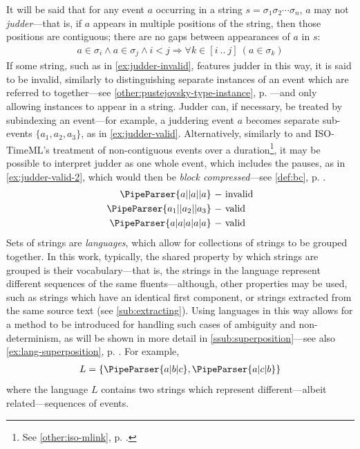 \documentclass[a4paper,12pt,leqno]{article}
\newcommand{\vph}[1]{\vphantom{#1}}
\newcommand{\ebox}[1]{\fbox{$\vph{'(),}#1$}}
\newcommand{\EventString}[1]{%
	\renewcommand*{\do}[1]{\ebox{##1}}%
	\PipeParser{#1}%
}
\begin{document}
It will be said that for any event $a$ occurring in a string $s = \sigma_1\sigma_2\cdots\sigma_n$, $a$ may not \textit{judder}---that is, if $a$ appears in multiple positions of the string, then those positions are contiguous; there are no gaps between appearances of $a$ in $s$:
\begin{align}\label{impl:contiguous-events}
	a \in \sigma_i \wedge a \in \sigma_j \wedge i < j \Longrightarrow \forall k \in [i~..~j]~(a \in \sigma_k)
\end{align}
If some string, such as in \cref{ex:judder-invalid}, features judder in this way, it is said to be invalid, similarly to \citet[p. 134]{Pustejovsky2005} distinguishing separate instances of an event which are referred to together---see \cref{other:pustejovsky-type-instance}, p. \pageref{other:pustejovsky-type-instance}---and only allowing instances to appear in a string. Judder can, if necessary, be treated by subindexing an event---for example, a juddering event $a$ becomes separate sub-events $\{a_1, a_2, a_3\}$, as in \cref{ex:judder-valid}. Alternatively, similarly to \citet{bunt2010annotating} and ISO-TimeML's treatment of non-contiguous events over a duration\footnote{See \cref{other:iso-mlink}, p. \pageref{other:iso-mlink}.}, it may be possible to interpret judder as one whole event, which includes the pauses, as in \cref{ex:judder-valid-2}, which would then be \textit{block compressed}---see \cref{def:bc}, p. \pageref{def:bc}.
\begin{subequations}\label{ex:judder}
	\begin{align}
		\EventString{a|{}|a|{}|a}\label{ex:judder-invalid} ~-~& \text{invalid}\\
		\EventString{a_1|{}|a_2|{}|a_3}\label{ex:judder-valid} ~-~& \text{valid}\\
		\EventString{a|a|a|a|a}\label{ex:judder-valid-2} ~-~& \text{valid}
	\end{align}
\end{subequations}
Sets of strings are \textit{languages}, which allow for collections of strings to be grouped together. In this work, typically, the shared property by which strings are grouped is their vocabulary---that is, the strings in the language represent different sequences of the same fluents---although, other properties may be used, such as strings which have an identical first component, or strings extracted from the same source text (see \cref{sub:extracting}). Using languages in this way allows for a method to be introduced for handling such cases of ambiguity and non-determinism, as will be shown in more detail in \cref{ssub:superposition}---see also \cref{ex:lang-superposition}, p. \pageref{ex:lang-superposition}. For example,
\begin{align}
	L = \{\EventString{a|b|c}, \EventString{a|c|b}\}
\end{align}
where the language $L$ contains two strings which represent different---albeit related---sequences of events.
\end{document}
